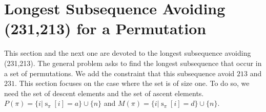 \documentclass[a4paper]{llncs}
\newcommand{\ptext}{\pi}
\newcommand{\pmotif}{\sigma}
\DeclareMathOperator{\stripea}{s}
\newcommand{\stripe}[2]{\stripea_{{#1}}[{#2}]}
\newcommand{\dstep}{d}
\newcommand{\ustep}{a}
\newcommand{\x}{X}
\newcommand{\y}{Y}
\newcommand{\pbmotif}{\pmotif^+}
\DeclareMathOperator{\PMa}{PM}
\newcommand{\PM}[6]{\PMa_{{#1}}^{{#2},{#3},{#4}}({#5},{#6})}
\begin{document}
%
%
%
%
%
%



\section{Longest Subsequence Avoiding \\(231,213) for a Permutation}
\label{section:LCS}

	This section and the next one are devoted to the longest subsequence avoiding (231,213).
	The general problem asks to find the longest subsequence that occur in a set of permutations. We add the constraint that this subsequence avoid $213$ and $231$.
	This section focuses on the case where the set is of size one.
	To do so, we need the set of descent elements and the set of ascent elements.
	$P(\pi) = \{i | \stripe{\pi}{i} = \ustep \} \cup \{n\}$ and
	$M(\pi) = \{i | \stripe{\pi}{i} = \dstep \} \cup \{n\}$.\\
\end{document}
